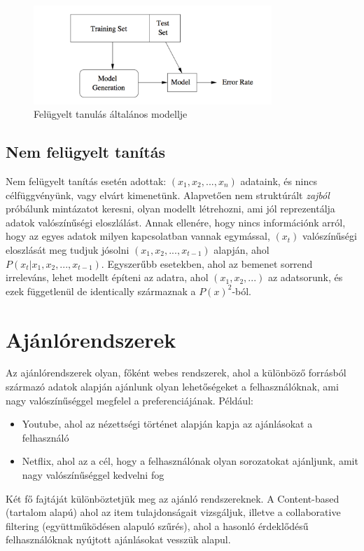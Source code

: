 \documentclass[a4paper,12pt]{article}
\begin{document}
\begin{figure}[ht!]
\centering
\includegraphics[width=90mm]{img/ml.png}
\caption{Felügyelt tanulás általános modellje \label{overflow}}
\end{figure}

\subsection{Nem felügyelt tanítás}
Nem felügyelt tanítás esetén adottak: $(x_1, x_2, ..., x_n)$ adataink, és nincs célfüggvényünk, vagy elvárt kimenetünk. Alapvetően nem struktúrált \textsl{zajból} próbálunk mintázatot keresni, olyan modellt létrehozni, ami jól reprezentálja adatok valószínűségi eloszlálást. Annak ellenére, hogy nincs információnk arról, hogy az egyes adatok milyen kapcsolatban vannak egymással, $(x_t)$ valószínűségi eloszlását meg tudjuk jósolni  $(x_1,x_2, ..., x_{t-1})$ alapján, ahol $P(x_t|x_1,x_2, ..., x_{t-1})$.
Egyszerűbb esetekben, ahol az bemenet sorrend irreleváns, lehet modellt építeni az adatra, ahol $(x_1, x_2, ...)$ az adatsorunk, és ezek függetlenül de identically származnak a $P(x)^2$-ból.~\cite{unsupervised}

\section{Ajánlórendszerek}
Az ajánlórendszerek olyan, főként webes rendszerek, ahol a különböző forrásból származó adatok alapján ajánlunk olyan lehetőségeket a felhasználóknak, ami nagy valószínűséggel megfelel a preferenciájának. Például:
\begin{itemize}
\item Youtube, ahol az nézettségi történet alapján kapja az ajánlásokat a felhasználó
\item Netflix, ahol az a cél, hogy a felhasználónak olyan sorozatokat ajánljunk, amit nagy valószínűséggel kedvelni fog
\end{itemize}
Két fő fajtáját különböztetjük meg az ajánló rendszereknek. A Content-based (tartalom alapú) ahol az item tulajdonságait vizsgáljuk, illetve a collaborative filtering (együttműködésen alapuló szűrés), ahol a hasonló érdeklődésű felhasználóknak nyújtott ajánlásokat vesszük alapul. \linebreak
\end{document}
